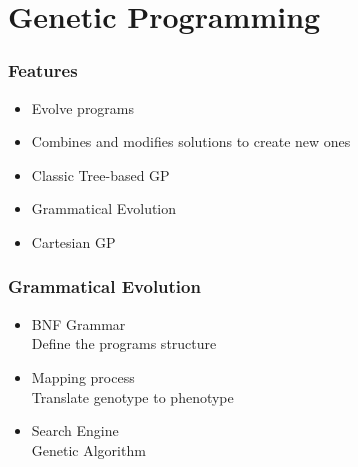 \documentclass[aspectratio=169]{beamer}
\begin{document}
	\section{Genetic Programming}
		\begin{frame}
			\frametitle{Features}

			\begin{itemize}
				\item Evolve programs
				\item Combines and modifies solutions to create new ones
			\end{itemize}

			\begin{itemize}
				\item Classic Tree-based GP
				\item Grammatical Evolution
				\item Cartesian GP
			\end{itemize}

		\end{frame}
		\begin{frame}
			\frametitle{Grammatical Evolution}

			\begin{itemize}
				\item BNF Grammar\\
					\textcolor{ExecusharesGrey}{\small\hspace{1em}Define the programs structure}
				\item Mapping process\\
					\textcolor{ExecusharesGrey}{\small\hspace{1em}Translate genotype to phenotype}
				\item Search Engine\\
					\textcolor{ExecusharesGrey}{\small\hspace{1em}Genetic Algorithm}
			\end{itemize}

		\end{frame}
\end{document}
